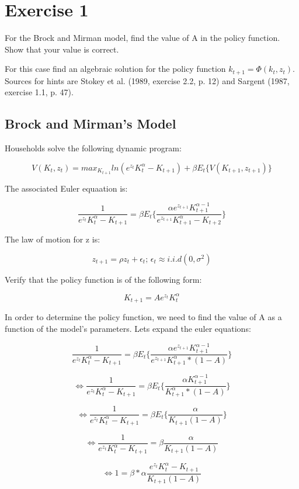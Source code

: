 \documentclass[a4paper]{article}
\begin{document}
\section*{Exercise 1}

For the Brock and Mirman model, find the value of A in the policy function. Show that your value is correct.

For this case find an algebraic solution for the policy function $k_{t+1} = \Phi(k_t, z_t)$. Sources for hints are Stokey et al. (1989, exercise 2.2, p. 12) and Sargent (1987, exercise 1.1, p. 47).

\subsection{Brock and Mirman's Model}

Households solve the following dynamic program:

$$ V(K_t, z_t) =  max_{K_{t+1}}ln(e^{z_t}K_t^{\alpha} - K_{t+1}) + \beta E_t\{V(K_{t+1}, z_{t+1})\}$$

The associated Euler equaation is:

$$ \frac{1}{e^{z_t}K_t^{\alpha} - K_{t+1}} =  \beta E_t\{\frac{\alpha e^{z_{t+1}}K_{t+1}^{\alpha-1}}{e^{z_{t+1}}K_{t+1}^{\alpha} - K_{t+2}}\}$$

The law of motion for z is:

$$z_{t+1} = \rho z_t + \epsilon_t \text{;   }\epsilon_t \approx i.i.d(0,\sigma^2)$$

Verify that the policy function is of the following form:

$$K_{t+1} = Ae^{z_t}K_t^{\alpha}$$

In order to determine the policy function, we need to find the value of A as a function of the model's parameters. Lets expand the euler equations:

$$ \frac{1}{e^{z_t}K_t^{\alpha} - K_{t+1}} =  \beta E_t\{\frac{\alpha e^{z_{t+1}}K_{t+1}^{\alpha-1}}{e^{z_{t+1}}K_{t+1}^{\alpha}*(1-A)}\}$$

$$ \iff \frac{1}{e^{z_t}K_t^{\alpha} - K_{t+1}} =  \beta E_t\{\frac{\alpha K_{t+1}^{\alpha-1}}{K_{t+1}^{\alpha}*(1-A)}\}$$

$$ \iff \frac{1}{e^{z_t}K_t^{\alpha} - K_{t+1}} =  \beta E_t\{\frac{\alpha}{K_{t+1}(1-A)}\}$$

$$ \iff \frac{1}{e^{z_t}K_t^{\alpha} - K_{t+1}} =  \beta \frac{\alpha}{K_{t+1}(1-A)}$$

$$ \iff 1 =  \beta*\alpha \frac{e^{z_t}K_t^{\alpha} - K_{t+1}}{K_{t+1}(1-A)}$$
\end{document}
